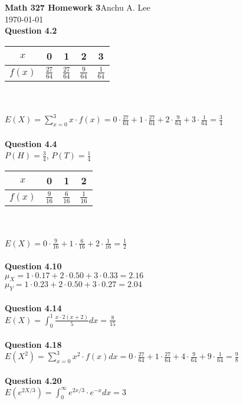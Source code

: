 \documentclass{article}
\begin{document}
    \noindent\textbf{Math 327 Homework 3}\hfill Anchu A. Lee\\
    \noindent\today\\
    
    \noindent\textbf{Question 4.2}\\
        \begin{tabular}{c|c c c c}

            $x$& 0 & 1 & 2 & 3\\
            \hline
            $f(x)$ & $\frac{27}{64}$ & $\frac{27}{64}$ & $\frac{9}{64}$ & $\frac{1}{64}$
        \end{tabular}\\\\
        $E(X) = \sum_{x=0}^{3}x\cdot f(x)= 0\cdot \frac{27}{64} + 1\cdot \frac{27}{64} + 2\cdot \frac{9}{64} + 3\cdot \frac{1}{64} = \frac{3}{4}$\\\\
    \textbf{Question 4.4}\\
        $P(H) = \frac{3}{4}$, $P(T) = \frac{1}{4}$\\
        \begin{tabular}{c|c c c}
            $x$ & 0 & 1 & 2\\
            \hline
            $f(x)$ & $\frac{9}{16}$ & $\frac{6}{16}$ & $\frac{1}{16}$
        \end{tabular}\\\\
        $E(X) = 0\cdot \frac{9}{16} + 1\cdot \frac{6}{16} + 2\cdot \frac{1}{16} = \frac{1}{2}$\\\\
    \textbf{Question 4.10}\\
        $\mu_X = 1\cdot 0.17 + 2\cdot 0.50 + 3\cdot 0.33 = 2.16$\\
        $\mu_Y = 1\cdot 0.23 + 2\cdot 0.50 + 3\cdot 0.27 = 2.04$\\\\
    \textbf{Question 4.14}\\
        $E(X) = \int_0^1\frac{x\cdot 2(x+2)}{5}dx = \frac{8}{15}$\\\\
    \textbf{Question 4.18}\\
        $E(X^2) = \sum_{x=0}^{3}x^2\cdot f(x)dx= 0\cdot \frac{27}{64} + 1\cdot \frac{27}{64} + 4\cdot \frac{9}{64} + 9\cdot \frac{1}{64} = \frac{9}{8}$\\\\
    \textbf{Question 4.20}\\
        $E(e^{2X/3}) = \int_{0}^{\infty}e^{2x/3}\cdot e^{-x}dx = 3$\\\\
\end{document}
